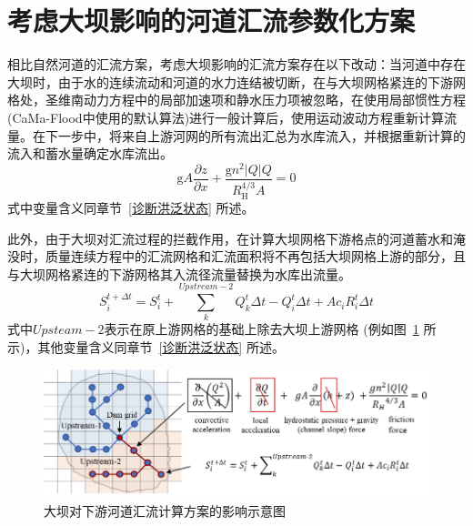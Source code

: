 \section{考虑大坝影响的河道汇流参数化方案}
相比自然河道的汇流方案，考虑大坝影响的汇流方案存在以下改动：当河道中存在大坝时，由于水的连续流动和河道的水力连结被切断，在与大坝网格紧连的下游网格处，圣维南动力方程中的局部加速项和静水压力项被忽略，在使用局部惯性方程(CaMa-Flood中使用的默认算法)进行一般计算后，使用运动波动方程重新计算流量。在下一步中，将来自上游河网的所有流出汇总为水库流入，并根据重新计算的流入和蓄水量确定水库流出。
\begin{equation}
  {\mathrm g} A \frac{\partial z}{\partial x}+\frac{{\mathrm g} n^{2}|Q| Q}{R_{\mathrm{H}}^{4 / 3} A}=0
\end{equation}
式中变量含义同章节~\ref{诊断洪泛状态} 所述。


此外，由于大坝对汇流过程的拦截作用，在计算大坝网格下游格点的河道蓄水和淹没时，质量连续方程中的汇流网格和汇流面积将不再包括大坝网格上游的部分，且与大坝网格紧连的下游网格其入流径流量替换为水库出流量。
\begin{equation}
  S_{i}^{t+\Delta t}=S_{i}^{t}+\sum_{k}^{Upstream-2} Q_{k}^{t} \Delta t-Q_{i}^{t} \Delta t+A c_{i} R_{i}^{t} \Delta t
\end{equation}
式中$Upsteam-2$表示在原上游网格的基础上除去大坝上游网格 (例如图~\ref{fig:大坝对下游河道汇流计算方案的影响示意图} 所示)，其他变量含义同章节~\ref{诊断洪泛状态} 所述。

{
  \begin{figure}[htbp]
    \centering
    \includegraphics{Figures/陆地表面的水分循环/大坝对下游河道汇流计算方案的影响示意图.png}
    \caption{大坝对下游河道汇流计算方案的影响示意图}
    \label{fig:大坝对下游河道汇流计算方案的影响示意图}
  \end{figure}
}
